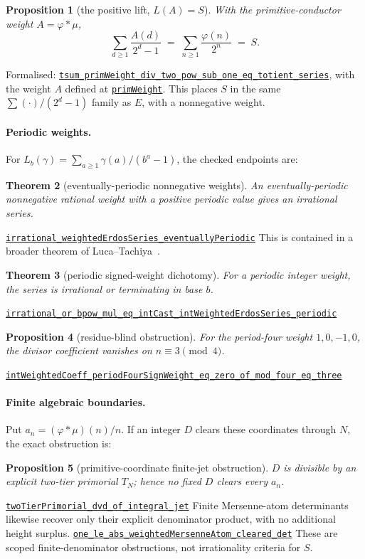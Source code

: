 \documentclass[11pt]{article}
\newcommand{\commit}{81150c1c6fdd4cd51e76d3aa0de344341e0e9e7c}
\newcommand{\repobase}{https://github.com/wcook04/plectis-lean-erdos249-257/blob/\commit}
\newcommand{\PK}{Erdos249257}
\newcommand{\lref}[3]{\href{\repobase/\PK/#1\#L#2}{\nolinkurl{#3}}}
\newcommand{\lrefx}[3]{\href{\repobase/\PK/#1\#L#2}{\nolinkurl{#3}}}
\newtheorem{theorem}{Theorem}[section]
\newtheorem{proposition}[theorem]{Proposition}
\theoremstyle{definition}
\theoremstyle{remark}
\newcommand{\ph}{\varphi}
\begin{document}
\begin{proposition}[the positive lift, $L(A)=S$]\label{res:lift}
With the primitive-conductor weight $A=\ph*\mu$,
\[
\sum_{d\ge1}\frac{A(d)}{2^d-1}\;=\;\sum_{n\ge1}\frac{\ph(n)}{2^n}\;=\;S.
\]
\end{proposition}
\noindent Formalised: \lref{CertificateKernel.lean}{18117}{tsum_primWeight_div_two_pow_sub_one_eq_totient_series},
with the weight $A$ defined at \lrefx{MersenneLambertLadder.lean}{252}{primWeight}. This
places $S$ in the same $\sum(\cdot)/(2^d-1)$ family as $E$, with a nonnegative weight.

\paragraph{Periodic weights.}\label{sec:periodicweights}
For \(L_b(\gamma)=\sum_{a\ge1}\gamma(a)/(b^a-1)\), the checked endpoints are:
\begin{theorem}[eventually-periodic nonnegative weights]
\label{res:periodicnonnegative}
An eventually-periodic nonnegative rational weight with a positive periodic
value gives an irrational series.
\end{theorem}
\lrefx{CertificateKernel.lean}{12397}{irrational_weightedErdosSeries_eventuallyPeriodic}
This is contained in a broader theorem of Luca--Tachiya~\cite{lucatachiya}.
\begin{theorem}[periodic signed-weight dichotomy]\label{res:periodicsigned}
For a periodic integer weight, the series is irrational or terminating in
base \(b\).
\end{theorem}
\lrefx{CertificateKernel.lean}{13847}{irrational_or_bpow_mul_eq_intCast_intWeightedErdosSeries_periodic}
\begin{proposition}[residue-blind obstruction]\label{res:periodfourobstruction}
For the period-four weight \(1,0,-1,0\), the divisor coefficient vanishes on
\(n\equiv3\pmod4\).
\end{proposition}
\lref{CertificateKernel.lean}{13898}{intWeightedCoeff_periodFourSignWeight_eq_zero_of_mod_four_eq_three}

\paragraph{Finite algebraic boundaries.}\label{sec:primitiveindex}
Put \(a_n=(\ph*\mu)(n)/n\).  If an integer \(D\) clears these coordinates
through \(N\), the exact obstruction is:
\begin{proposition}[primitive-coordinate finite-jet obstruction]
\label{res:primitiveindex}
\(D\) is divisible by an explicit two-tier primorial \(T_N\); hence no fixed
\(D\) clears every \(a_n\).
\end{proposition}
\lref{PrimitiveDeterminantLift.lean}{148}{twoTierPrimorial_dvd_of_integral_jet}
Finite Mersenne-atom determinants likewise recover only their explicit
denominator product, with no additional height surplus.
\lrefx{MersenneTailAtoms.lean}{181}{one_le_abs_weightedMersenneAtom_cleared_det}
These are scoped finite-denominator obstructions, not irrationality criteria
for \(S\).
\end{document}

